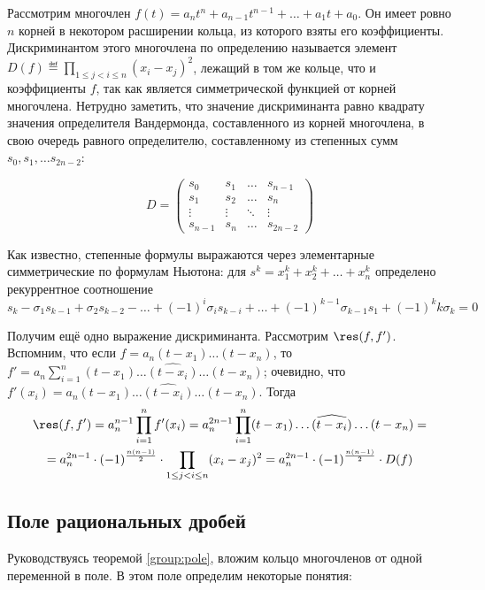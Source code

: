 Рассмотрим многочлен $f(t)=a_nt^n+a_{n-1}t^{n-1}+\dots+a_1t+a_0$. Он имеет ровно $n$ корней в некотором расширении кольца, из которого взяты его коэффициенты. Дискриминантом этого многочлена по определению называется элемент $D(f)\eqdef\prod\limits_{1\le j<i\le n}(x_i-x_j)^2$, лежащий в том же кольце, что и коэффициенты $f$, так как является симметрической функцией от корней многочлена. Нетрудно заметить, что значение дискриминанта равно квадрату значения определителя Вандермонда, составленного из корней многочлена, в свою очередь равного определителю, составленному из степенных сумм $s_0, s_1,\dots s_{2n-2}$:

$$
 D =
 \left(
   \begin{matrix}
     s_0 & s_1 & \dots & s_{n-1}\\
     s_1 & s_2 & \dots & s_{n}  \\
     \vdots & \vdots & \ddots & \vdots\\
     s_{n-1} & s_{n} & \dots & s_{2n-2}
   \end{matrix}
 \right)
$$

Как известно, степенные формулы выражаются через элементарные симметрические по формулам Ньютона: для $s^k = x_1^k+x_2^k+\dots+x_n^k$ определено рекуррентное соотношение
$$
 s_k - \sigma_1s_{k-1}+\sigma_2s_{k-2}-\dots+(-1)^i\sigma_is_{k-i}+\dots+(-1)^{k-1}\sigma_{k-1}s_1+(-1)^kk\sigma_k=0
$$

Получим ещё одно выражение дискриминанта. Рассмотрим $\res(f,f')$. Вспомним, что если $f=a_n(t-x_1)\dots(t-x_n)$, то $f'=a_n\sum\limits_{i=1}^n(t-x_1)\dots\widehat{(t-x_i)}\dots(t-x_n)$; очевидно, что $f'(x_i)=a_n(t-x_1)\dots\widehat{(t-x_i)}\dots(t-x_n)$. Тогда
\begin{multline*}
  \res(f,f')=a_n^{n-1}\prod_{i=1}^nf'(x_i)=a_n^{2n-1}\prod_{i=1}^n(t-x_1)\dots\widehat{(t-x_i)}\dots(t-x_n)=\\=a_n^{2n-1}\cdot(-1)^{\frac{n(n-1)}2}\cdot\prod_{1\le j<i\le n}(x_i-x_j)^2 = a^{2n-1}_n\cdot(-1)^{\frac{n(n-1)}2}\cdot D(f)
\end{multline*}

\subsection{Поле рациональных дробей}

Руководствуясь теоремой \ref{group:pole}, вложим кольцо многочленов от одной переменной в поле. В этом поле определим некоторые понятия:

